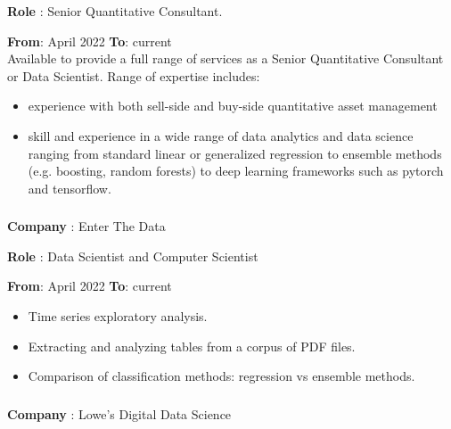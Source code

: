 \documentclass[
]{article}
\providecommand{\tightlist}{%
  \setlength{\itemsep}{0pt}\setlength{\parskip}{0pt}}
\begin{document}
\begin{flushleft}
\textbf{Role} : Senior Quantitative Consultant.
\end{flushleft}
{\textbf{From}: April 2022 \hspace{0.5in}  \textbf{To}: current \\

Available to provide a full range of services as a Senior Quantitative Consultant or Data Scientist.
Range of expertise includes:
\begin{itemize}
\item experience with both sell-side and buy-side quantitative asset management
\item skill and experience in a wide range of data analytics and data science ranging from standard linear or generalized regression to ensemble methods (e.g. boosting, random forests) to deep learning frameworks such as pytorch and tensorflow.
\end{itemize}

\hypertarget{enter the data}
{\subsubsection{} \label{enterthedata}}

\begin{flushleft}
\textbf{Company} : Enter The Data
\end{flushleft}

\begin{flushleft}
\textbf{Role} : Data Scientist and Computer Scientist
\end{flushleft}
{\textbf{From}: April 2022 \hspace{0.5in}  \textbf{To}: current
\begin{itemize}
\tightlist
\item  Time series exploratory analysis.
\item  Extracting and analyzing tables from a corpus of PDF files.
\item  Comparison of classification methods: regression vs ensemble methods.
\end{itemize}

\hypertarget{lowes}
{\subsubsection{} \label{lowes}}

\begin{flushleft}
\textbf{Company} : Lowe's Digital Data Science 
\end{flushleft}

}}
\end{document}
